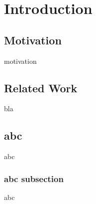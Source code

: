 \chapter{Introduction}\label{cha1}
\section{Motivation}
motivation

\section{Related Work}\label{relatedWork}
bla


\section{abc}\label{abc}
abc






\subsection{abc subsection}
abc











